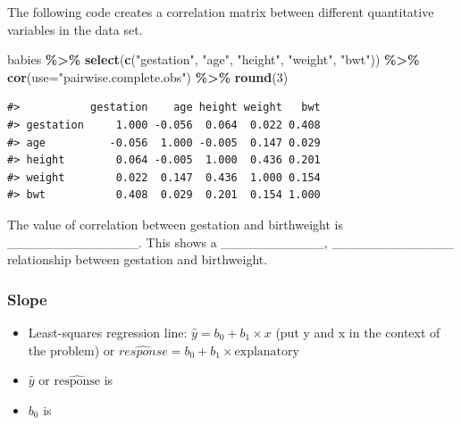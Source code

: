 \documentclass[
]{report}
\newenvironment{Shaded}{\begin{snugshade}}{\end{snugshade}}
\newcommand{\AttributeTok}[1]{\textcolor[rgb]{0.13,0.29,0.53}{#1}}
\newcommand{\DecValTok}[1]{\textcolor[rgb]{0.00,0.00,0.81}{#1}}
\newcommand{\FunctionTok}[1]{\textcolor[rgb]{0.13,0.29,0.53}{\textbf{#1}}}
\newcommand{\NormalTok}[1]{#1}
\newcommand{\SpecialCharTok}[1]{\textcolor[rgb]{0.81,0.36,0.00}{\textbf{#1}}}
\newcommand{\StringTok}[1]{\textcolor[rgb]{0.31,0.60,0.02}{#1}}
\providecommand{\tightlist}{%
  \setlength{\itemsep}{0pt}\setlength{\parskip}{0pt}}
\begin{document}
The following code creates a correlation matrix between different quantitative variables in the data set.

\begin{Shaded}
\begin{Highlighting}[]
\NormalTok{babies }\SpecialCharTok{\%\textgreater{}\%}
    \FunctionTok{select}\NormalTok{(}\FunctionTok{c}\NormalTok{(}\StringTok{"gestation"}\NormalTok{, }\StringTok{"age"}\NormalTok{, }\StringTok{"height"}\NormalTok{, }\StringTok{"weight"}\NormalTok{, }\StringTok{"bwt"}\NormalTok{)) }\SpecialCharTok{\%\textgreater{}\%}
    \FunctionTok{cor}\NormalTok{(}\AttributeTok{use=}\StringTok{"pairwise.complete.obs"}\NormalTok{) }\SpecialCharTok{\%\textgreater{}\%}
    \FunctionTok{round}\NormalTok{(}\DecValTok{3}\NormalTok{)}
\end{Highlighting}
\end{Shaded}

\begin{verbatim}
#>           gestation    age height weight   bwt
#> gestation     1.000 -0.056  0.064  0.022 0.408
#> age          -0.056  1.000 -0.005  0.147 0.029
#> height        0.064 -0.005  1.000  0.436 0.201
#> weight        0.022  0.147  0.436  1.000 0.154
#> bwt           0.408  0.029  0.201  0.154 1.000
\end{verbatim}


The value of correlation between gestation and birthweight is \_\_\_\_\_\_\_\_\_\_\_\_\_\_. This shows a \_\_\_\_\_\_\_\_\_\_\_, \_\_\_\_\_\_\_\_\_\_\_\_\_ relationship between gestation and birthweight.


\subsubsection*{Slope}\label{slope}

\begin{itemize}
\item
  Least-squares regression line: \(\hat{y}=b_0+b_1\times x\) (put y and x in the context of the problem) or \(\widehat{response}=b_0+b_1 \times \text{explanatory}\)
\item
  \(\hat{y}\) or \(\widehat{\text{response}}\) is
\end{itemize}

\vspace{0.1in}

\begin{itemize}
\tightlist
\item
  \(b_0\) is
\end{itemize}
\end{document}
